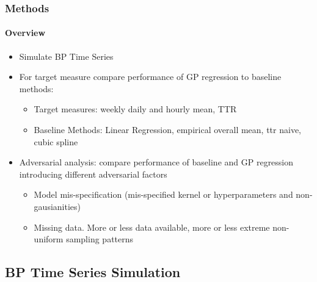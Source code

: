 \documentclass[
	8pt, %
]{beamer}
\begin{document}
\begin{frame}
	\frametitle{Methods}
	\framesubtitle{Overview}

	\begin{itemize}
		\item Simulate BP Time Series
	\end{itemize}

	\bigskip %

	\begin{itemize}
		\item For target measure compare performance of GP regression to baseline methods:
		\begin{itemize}
			\item Target measures: weekly daily and hourly mean, TTR
			\item Baseline Methods: Linear Regression, empirical overall mean, ttr naive, cubic spline
		\end{itemize}
	\end{itemize}

	\bigskip %

	\begin{itemize}
		\item Adversarial analysis: compare performance of baseline and GP regression introducing different adversarial
		factors
		\begin{itemize}
			\item Model mis-specification (mis-specified kernel or hyperparameters and non-gausianities)
			\item Missing data. More or less data available, more or less extreme non-uniform sampling patterns
		\end{itemize}

	\end{itemize}

\end{frame}

\subsection{BP Time Series Simulation}
\end{document}
